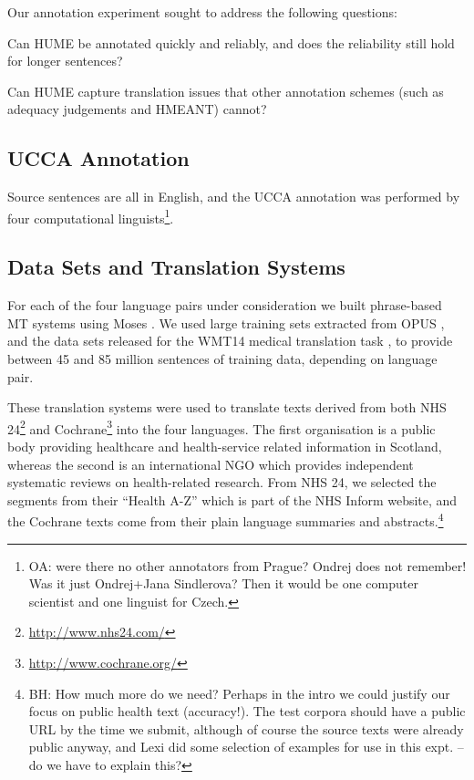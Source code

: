 \documentclass[11pt]{article}
\newcommand{\oa}[1]{\footnote{\color{red}OA: #1}}
\newcommand{\bh}[1]{\footnote{\color{blue}BH: #1}}
\begin{document}
Our annotation experiment sought to address the following questions:
\begin{compactitem}
\item Can HUME be annotated quickly and reliably, and does the reliability still hold for longer sentences?
\item Can HUME capture translation issues that other annotation schemes (such as
adequacy judgements and HMEANT)
cannot?
\end{compactitem}

\subsection{UCCA Annotation}
Source sentences are all in English, and the UCCA annotation was performed by four
computational linguists\oa{were there no other annotators from Prague? Ondrej
does not remember! Was it just Ondrej+Jana Sindlerova? Then it would be one
computer scientist and one linguist for Czech.}.

\subsection{Data Sets and Translation Systems}

For each of the four language pairs under consideration  we built phrase-based MT systems
using Moses \cite{Koehn:2007}. We used large training sets extracted from OPUS \cite{tiedemann:2009}, and
the data sets released for the WMT14 medical translation task \cite{bojar-EtAl:2014:W14-33}, to provide between
45 and 85 million sentences of training data, depending on language pair.

These translation systems were used to translate texts derived from both NHS 24\footnote{\url{http://www.nhs24.com/}} and 
Cochrane\footnote{\url{http://www.cochrane.org/}} into the four languages. The first organisation is a public body
providing healthcare and health-service related information in Scotland, whereas the second is an international NGO which 
provides independent systematic reviews on health-related research. From NHS 24, we selected the segments from their
``Health A-Z'' which is part of the NHS Inform website, and the Cochrane texts come from their plain language summaries
and abstracts.\bh{How much more do we need? Perhaps in the intro we could justify our focus on public health text
(accuracy!). The test corpora should have a public URL by the time we submit, although of course the source texts were 
already public anyway, and Lexi did some selection of examples for use in this expt. -- do we have to explain this?}
\end{document}
